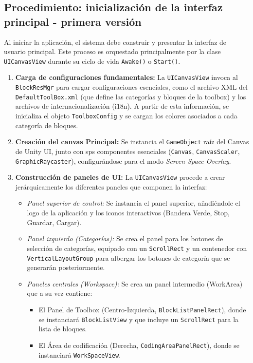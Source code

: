 \subsection{Procedimiento: inicialización de la interfaz principal - primera versión}
Al iniciar la aplicación, el sistema debe construir y presentar la interfaz de usuario principal. Este proceso es orquestado principalmente por la clase \texttt{UICanvasView} durante su ciclo de vida \texttt{Awake()} o \texttt{Start()}.
\begin{enumerate}
	\item \textbf{Carga de configuraciones fundamentales:} La \texttt{UICanvasView} invoca al \texttt{BlockResMgr} para cargar configuraciones esenciales, como el archivo XML del \texttt{DefaultToolBox.xml} (que define las categorías y bloques de la toolbox) y los archivos de internacionalización (i18n). A partir de esta información, se inicializa el objeto \texttt{ToolboxConfig} y se cargan los colores asociados a cada categoría de bloques.
	\item \textbf{Creación del canvas Principal:} Se instancia el \texttt{GameObject} raíz del Canvas de Unity UI, junto con sps componentes esenciales (\texttt{Canvas}, \texttt{CanvasScaler}, \texttt{GraphicRaycaster}), configurándose para el modo \textit{Screen Space Overlay}.
	\item \textbf{Construcción de paneles de UI:} La \texttt{UICanvasView} procede a crear jerárquicamente los diferentes paneles que componen la interfaz:
	\begin{itemize}
		\item \textit{Panel superior de control:} Se instancia el panel superior, añadiéndole el logo de la aplicación y los iconos interactivos (Bandera Verde, Stop, Guardar, Cargar).
		\item \textit{Panel izquierdo (Categorías):} Se crea el panel para los botones de selección de categorías, equipado con un \texttt{ScrollRect} y un contenedor con \texttt{VerticalLayoutGroup} para albergar los botones de categoría que se generarán posteriormente.
		\item \textit{Paneles centrales (Workspace):} Se crea un panel intermedio (WorkArea) que a su vez contiene:
		\begin{itemize}
			\item El Panel de Toolbox (Centro-Izquierda, \texttt{BlockListPanelRect}), donde se instanciará \texttt{BlockListView} y que incluye un \texttt{ScrollRect} para la lista de bloques.
			\item El Área de codificación (Derecha, \texttt{CodingAreaPanelRect}), donde se instanciará \texttt{WorkSpaceView}.

\end{itemize}
\end{itemize}
\end{enumerate}
